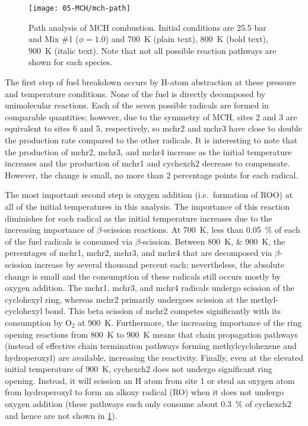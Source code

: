 \documentclass[../main.tex]{subfiles}
\begin{document}
\begin{figure}
    \texttt{[image: 05-MCH/mch-path]}
    \caption{Path analysis of MCH combustion. Initial conditions are 25.5 bar
    and Mix \#1 ($\phi=\num{1.0}$) and \SI{700}{\kelvin} (plain text),
    \SI{800}{\kelvin} (bold text), \SI{900}{\kelvin} (italic text).
    Note that not all possible reaction pathways are shown for
    each species.}
    \label{fig:mch-path}
\end{figure}

The first step of fuel breakdown occurs by H-atom abstraction at these pressure
and temperature conditions. None of the fuel is directly decomposed by
unimolecular reactions. Each of the seven possible radicals are formed in
comparable quantities; however, due to the symmetry of MCH, sites 2 and 3 are
equivalent to sites 6 and 5, respectively, so mchr2 and mchr3 have close to
double the production rate compared to the other radicals. It is interesting to
note that the production of mchr2, mchr3, and mchr4 increase as the initial
temperature increases and the production of mchr1 and cychexch2 decrease to
compensate. However, the change is small, no more than 2 percentage points for
each radical.

The most important second step is oxygen addition (i.e.\ formation of ROO) at
all of the initial temperatures in this analysis. The importance of this
reaction diminishes for each radical as the initial temperature increases due
to the increasing importance of $\beta$-scission reactions. At \SI{700}{\kelvin}, less than
\SI{0.05}{\percent} of each of the fuel radicals is consumed via $\beta$-scission. Between
\SIlist{800;900}{\kelvin}, the percentages of mchr1, mchr2, mchr3, and mchr4 that are decomposed
via $\beta$-scission increase by several thousand percent each; nevertheless,
the absolute change is small and the consumption of these radicals still occurs
mostly by oxygen addition. The mchr1, mchr3, and mchr4 radicals undergo
scission of the cyclohexyl ring, whereas mchr2 primarily undergoes scission at the
methyl-cyclohexyl bond. This beta scission of mchr2 competes significantly with
its consumption by O$_2$ at \SI{900}{\kelvin}. Furthermore, the increasing importance of the
ring opening reactions from \SI{800}{\kelvin} to \SI{900}{\kelvin} means that chain propagation pathways
(instead of effective chain termination pathways forming methylcyclohexene and
hydroperoxyl) are available, increasing the reactivity. Finally, even at the
elevated initial temperature of \SI{900}{\kelvin}, cychexch2 does not undergo significant
ring opening. Instead, it will scission an H atom from site 1 or steal an oxygen
atom from hydroperoxyl to form an alkoxy radical (RO) when it does not undergo
oxygen addition (these pathways each only consume about \SI{0.3}{\percent} of cychexch2 and
hence are not shown in \cref{fig:mch-path}).
\end{document}
